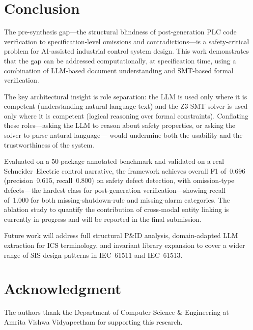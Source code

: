 \documentclass[conference]{IEEEtran}
\begin{document}
\section{Conclusion}

The pre-synthesis gap---the structural blindness of post-generation PLC
code verification to specification-level omissions and contradictions---is
a safety-critical problem for AI-assisted industrial control system design.
This work demonstrates that the gap can be addressed computationally, at
specification time, using a combination of LLM-based document understanding
and SMT-based formal verification.

The key architectural insight is role separation: the LLM is used only
where it is competent (understanding natural language text) and the Z3
SMT solver is used only where it is competent (logical reasoning over
formal constraints). Conflating these roles---asking the LLM to reason
about safety properties, or asking the solver to parse natural language---
would undermine both the usability and the trustworthiness of the system.

Evaluated on a 50-package annotated benchmark and validated on a
real Schneider~Electric control narrative, the framework achieves overall
F1 of~0.696 (precision~0.615, recall~0.800) on safety defect detection,
with omission-type defects---the hardest class for post-generation
verification---showing recall of~1.000 for both missing-shutdown-rule
and missing-alarm categories.
The ablation study to quantify the contribution of cross-modal entity
linking is currently in progress and will be reported in the final submission.

Future work will address full structural P\&ID analysis, domain-adapted
LLM extraction for ICS terminology, and invariant library expansion to
cover a wider range of SIS design patterns in IEC~61511 and IEC~61513.

\section*{Acknowledgment}
The authors thank the Department of Computer Science \& Engineering at
Amrita Vishwa Vidyapeetham for supporting this research.



\end{document}
